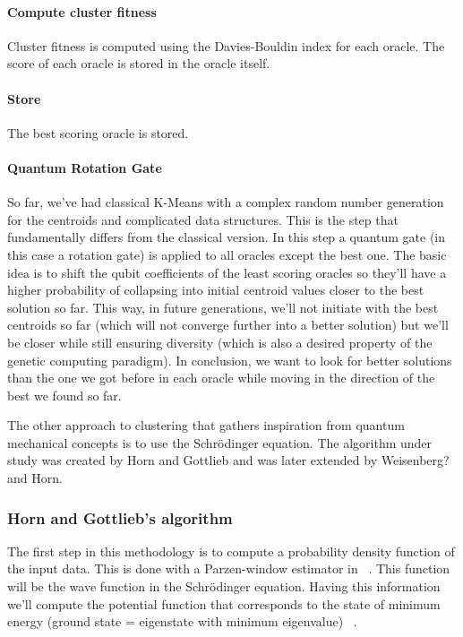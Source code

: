 \paragraph{Compute cluster fitness}
Cluster fitness is computed using the Davies-Bouldin index for each oracle. The score of each oracle is stored in the oracle itself.

\paragraph{Store}
The best scoring oracle is stored.

\paragraph{Quantum Rotation Gate}
So far, we've had classical K-Means with a complex random number generation for the centroids and complicated data structures. This is the step that fundamentally differs from the classical version. In this step a quantum gate (in this case a rotation gate) is applied to all oracles except the best one. The basic idea is to shift the qubit coefficients of the least scoring oracles so they'll have a higher probability of collapsing into initial centroid values closer to the best solution so far. This way, in future generations, we'll not initiate with the best centroids so far (which will not converge further into a better solution) but we'll be closer while still ensuring diversity (which is also a desired property of the genetic computing paradigm). In conclusion, we want to look for better solutions than the one we got before in each oracle while moving in the direction of the best we found so far.


The other approach to clustering that gathers inspiration from quantum mechanical concepts is to use the Schrödinger equation. The algorithm under study was created by Horn and Gottlieb and was later extended by Weisenberg? and Horn.


\subsubsection{Horn and Gottlieb's algorithm}

The first step in this methodology is to compute a probability density function of the input data. This is done with a Parzen-window estimator in ~\cite{Horn2001a,Weinstein2009}. This function will be the wave function in the Schrödinger equation. Having this information we'll compute the potential function that corresponds to the state of minimum energy (ground state = eigenstate with minimum eigenvalue) ~\cite{Horn2001a}.

